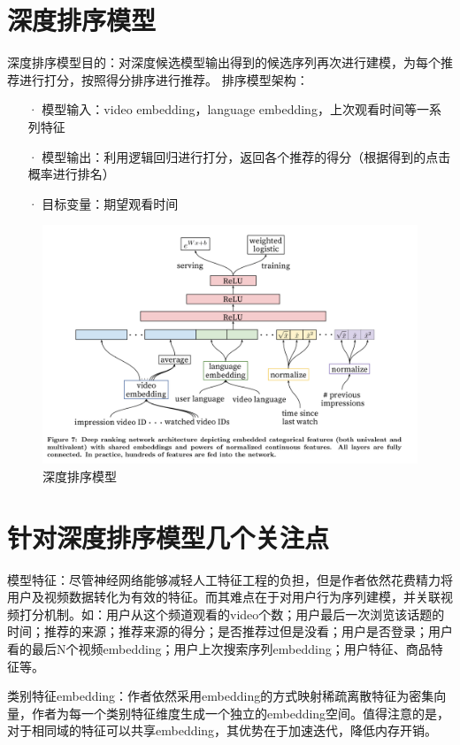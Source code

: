 \documentclass[UTF8]{ctexart}
\begin{document}
	\section{深度排序模型}\label{sec:diwujie}
	深度排序模型目的：对深度候选模型输出得到的候选序列再次进行建模，为每个推荐进行打分，按照得分排序进行推荐。
	排序模型架构：
	\begin{itemize}
		\item[·] 模型输入：video embedding，language embedding，上次观看时间等一系列特征
		\item[·] 模型输出：利用逻辑回归进行打分，返回各个推荐的得分（根据得到的点击概率进行排名）
		\item[·] 目标变量：期望观看时间
	\end{itemize}
		\begin{figure}[ht]
	    \centering
	    \includegraphics[scale=0.5]{picture/006.png}
	    \caption{深度排序模型}
	    \label{fig:006}
	\end{figure}
	\clearpage
	\section{针对深度排序模型几个关注点}\label{sec:diliujie}
	模型特征：尽管神经网络能够减轻人工特征工程的负担，但是作者依然花费精力将用户及视频数据转化为有效的特征。而其难点在于对用户行为序列建模，并关联视频打分机制。如：用户从这个频道观看的video个数；用户最后一次浏览该话题的时间；推荐的来源；推荐来源的得分；是否推荐过但是没看；用户是否登录；用户看的最后N个视频embedding；用户上次搜索序列embedding；用户特征、商品特征等。
	
	类别特征embedding：作者依然采用embedding的方式映射稀疏离散特征为密集向量，作者为每一个类别特征维度生成一个独立的embedding空间。值得注意的是，对于相同域的特征可以共享embedding，其优势在于加速迭代，降低内存开销。
	
\end{document}
